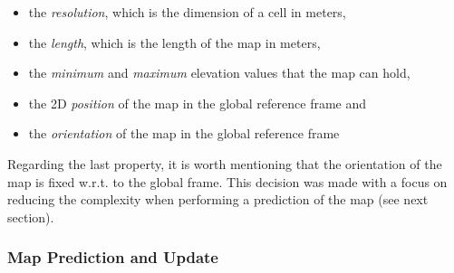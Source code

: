 \begin{itemize}
    \item the \textit{resolution}, which is the dimension of a cell in meters,
    \item the \textit{length}, which is the length of the map in meters,
    \item the \textit{minimum} and \textit{maximum} elevation values that
        the map can hold,
    \item the 2D \textit{position} of the map in the global reference frame and
    \item the \textit{orientation} of the map in the global reference frame
\end{itemize}

Regarding the last property, it is worth mentioning that the orientation
of the map is fixed w.r.t. to the global frame.
This decision was made with a focus on reducing the complexity when performing
a prediction of the map (see next section).

\subsubsection{Map Prediction and Update} \label{map_prediction_and_update}

